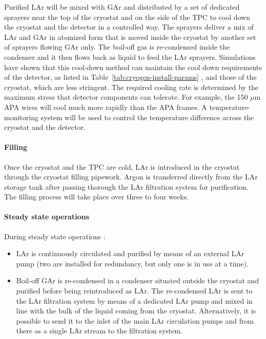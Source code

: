 Purified LAr will be mixed with GAr and distributed by a set of dedicated sprayers near the top of the cryostat and on the side of the TPC to cool down the cryostat and the detector in a controlled way. The sprayers deliver a mix of LAr and GAr in atomized form that is moved inside the cryostat by another set of sprayers flowing GAr only. The boil-off gas is re-condensed inside the condenser and it then flows back as liquid to feed the LAr sprayers. Simulations have shown that this cool-down method can maintain the cool down requirements of the detector, as listed in Table~\ref{tab:cryogen-install-params} , and those of the cryostat, which are less stringent. The required cooling rate is determined by the maximum stress that detector components can tolerate. For example, the 150 $\mu$m APA wires will cool much more rapidly than the APA frames. A temperature-monitoring system will be used to control the temperature difference across the cryostat and the detector.

\paragraph{Filling}

Once the cryostat and the TPC are cold, LAr is introduced in the cryostat through the cryostat filling pipework. Argon is transferred directly from the LAr storage tank after passing thorough the LAr filtration system for purification. The filling process will take place over three to four weeks.

\paragraph{Steady state operations}

During steady state operations :
\begin{itemize}
\item LAr is continuously circulated and purified by means of an external LAr pump (two are installed for redundancy, but only one is in use at a time).
\item Boil-off GAr is re-condensed in a condenser situated outside the cryostat and purified before being reintroduced as LAr. The re-condensed LAr is sent to the LAr filtration system by means of a dedicated LAr pump and mixed in line with the bulk of the liquid coming from the cryostat. Alternatively, it is possible to send it to the inlet of the main LAr circulation pumps and from there as a single LAr stream to the filtration system.
\end{itemize}

